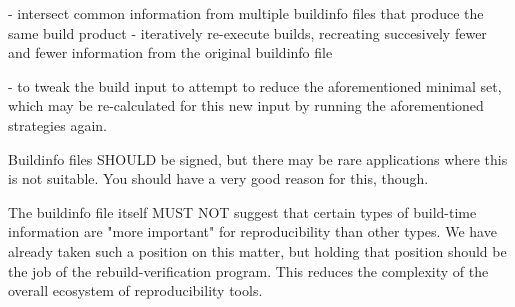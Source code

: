   - intersect common information from multiple buildinfo files that produce
    the same build product
  - iteratively re-execute builds, recreating succesively fewer and fewer
    information from the original buildinfo file

- to tweak the build input to attempt to reduce the aforementioned minimal set,
  which may be re-calculated for this new input by running the aforementioned
  strategies again.

Buildinfo files SHOULD be signed, but there may be rare applications where this
is not suitable. You should have a very good reason for this, though.

The buildinfo file itself MUST NOT suggest that certain types of build-time
information are "more important" for reproducibility than other types. We have
already taken such a position on this matter, but holding that position should
be the job of the rebuild-verification program. This reduces the complexity of
the overall ecosystem of reproducibility tools.
